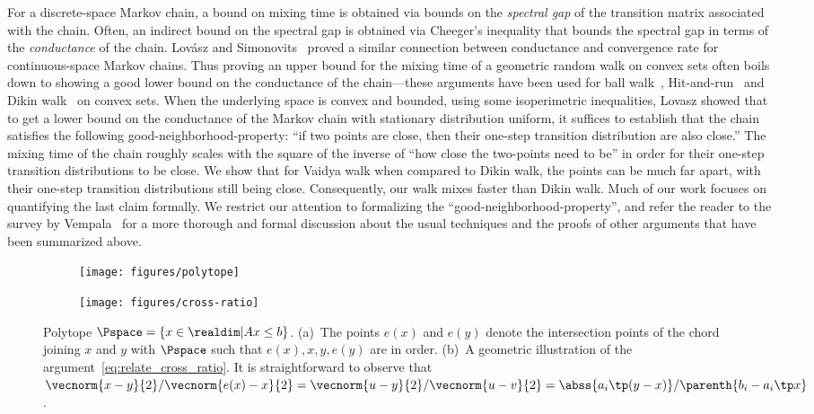 For a discrete-space Markov chain, a bound on mixing time is obtained via bounds on the \emph{spectral gap} of the transition matrix associated with the chain.
Often, an indirect bound on the spectral gap is obtained via Cheeger's inequality that bounds the spectral gap in terms of the \emph{conductance} of the chain.
Lov{\'a}sz and Simonovits~\cite{lovasz1993random} proved a similar connection between conductance and convergence rate for continuous-space Markov chains.
Thus proving an upper bound for the mixing time of a geometric random walk on convex sets often boils down to showing a good lower bound on the conductance of the chain---these arguments have been used for ball walk~\cite{lovasz1990ballwalk}, Hit-and-run~\cite{lovasz1999hit,lovasz2006hit} and Dikin walk~\cite{narayanan2016randomized,kannan2012random,sachdeva2016mixing} on convex sets.
When the underlying space is convex and bounded, using some isoperimetric inequalities, Lovasz showed that to get a lower bound on the conductance of the Markov chain with stationary distribution uniform, it suffices to establish that the chain satisfies the following good-neighborhood-property: ``if two points are close, then their one-step transition distribution are also close.''
The mixing time of the chain roughly scales with the square of the inverse of ``how close the two-points need to be'' in order for their one-step transition distributions to be close.
We show that for Vaidya walk when compared to Dikin walk, the points can be much far apart, with their one-step transition distributions still being close.
Consequently, our walk mixes faster than Dikin walk.
Much of our work focuses on quantifying the last claim formally.
We restrict our attention to formalizing the ``good-neighborhood-property'', and refer the reader to the survey by Vempala~\cite{vempala2005geometric} for a more thorough and formal discussion about the usual techniques and the proofs of other arguments that have been summarized above.

\begin{figure}
  \centering
  \begin{subfigure}[h]{0.45\linewidth}
    \centering
    \texttt{[image: figures/polytope]}
    \caption{}
    \label{fig:basic_polytope}
  \end{subfigure}
  \begin{subfigure}[h]{0.45\linewidth}
    \centering
    \texttt{[image: figures/cross-ratio]}
    \caption{}
    \label{fig:cross_ratio}
  \end{subfigure}
  \caption{Polytope $\Pspace = \{x\in \realdim\vert Ax \leq b \}$.
  (a)~The points $e(x)$ and $e(y)$ denote the intersection points of the chord joining $x$ and $y$ with $\Pspace$ such that $e(x), x, y, e(y)$ are in order.
  (b)~A geometric illustration of the argument~\eqref{eq:relate_cross_ratio}. It is straightforward to observe that ${\vecnorm{x-y}{2}}/{\vecnorm{e(x)-x}{2}} = {\vecnorm{u-y}{2}}/{\vecnorm{u-v}{2}} = {\abss{a_i\tp(y-x)}}/\parenth{b_i-a_i\tp x}$.
  }
  \label{fig:polytope_and_end_points}
\end{figure}

